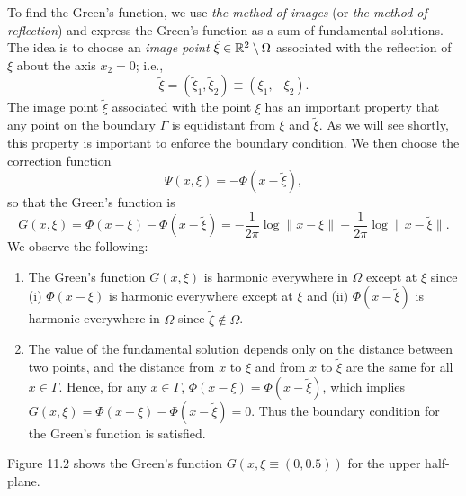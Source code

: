 To find the Green's function, we use \textit{the method of images} (or \textit{the method of reflection}) and express the Green's function as a sum of fundamental solutions. The idea is to choose an \textit{image point} $\tilde{\xi} \in \mathbb{R}^2 \setminus \Omega$ associated with the reflection of $\xi$ about the axis $x_2 = 0$; i.e.,
\[\tilde{\xi} = (\tilde{\xi}_1, \tilde{\xi}_2) \equiv (\xi_1, -\xi_2).\]
The image point $\tilde{\xi}$ associated with the point $\xi$ has an important property that any point on the boundary $\Gamma$ is equidistant from $\xi$ and $\tilde{\xi}$. As we will see shortly, this property is important to enforce the boundary condition. We then choose the correction function
\[\Psi(x, \xi) = -\Phi(x - \tilde{\xi}),\]
so that the Green's function is
\[G(x, \xi) = \Phi(x - \xi) - \Phi(x - \tilde{\xi}) = -\frac{1}{2\pi}\log\|x - \xi\| + \frac{1}{2\pi}\log\|x - \tilde{\xi}\|.\]
We observe the following:
\begin{enumerate}
    \item The Green's function $G(x, \xi)$ is harmonic everywhere in $\Omega$ except at $\xi$ since (i) $\Phi(x - \xi)$ is harmonic everywhere except at $\xi$ and (ii) $\Phi(x - \tilde{\xi})$ is harmonic everywhere in $\Omega$ since $\tilde{\xi} \notin \Omega$.
    \item The value of the fundamental solution depends only on the distance between two points, and the distance from $x$ to $\xi$ and from $x$ to $\tilde{\xi}$ are the same for all $x \in \Gamma$. Hence, for any $x \in \Gamma$, $\Phi(x - \xi) = \Phi(x - \tilde{\xi})$, which implies $G(x, \xi) = \Phi(x - \xi) - \Phi(x - \tilde{\xi}) = 0$. Thus the boundary condition for the Green's function is satisfied.
\end{enumerate}
Figure 11.2 shows the Green's function $G(x, \xi \equiv (0, 0.5))$ for the upper half-plane.


